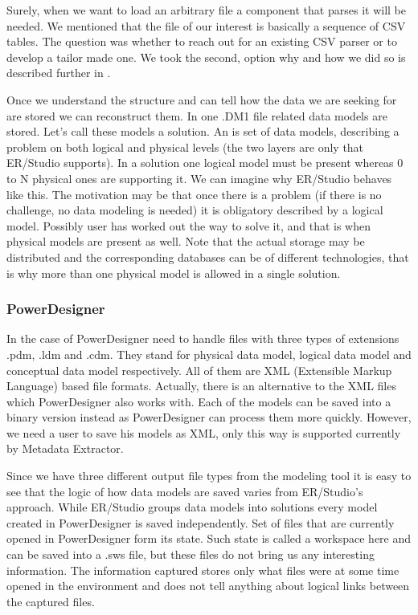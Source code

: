 Surely, when we want to load an arbitrary file a component that parses it will be needed. 
We mentioned that the file of our interest is basically a sequence of CSV tables. The question was whether to reach out for an existing CSV parser or to develop a tailor made one. We took the second, option why and how we did so is described further in .

Once we understand the structure and can tell how the data we are seeking for are stored we can reconstruct them.
In one .DM1 file related data models are stored. Let's call these models a solution. An  is set of data models, describing a problem on both logical and physical levels (the two layers are only that ER/Studio supports). In a solution one logical model must be present whereas 0 to N physical ones are supporting it. 
We can imagine why ER/Studio behaves like this. The motivation may be that once there is a problem (if there is no challenge, no data modeling is needed) it is obligatory described by a logical model. Possibly user has worked out the way to solve it, and that is when physical models are present as well. 
Note that the actual storage may be distributed and the corresponding databases can be of different technologies, that is why more than one physical model is allowed in a single solution.

\subsubsection{PowerDesigner}

In the case of PowerDesigner need to handle files with three types of extensions .pdm, .ldm and .cdm. They  stand for physical data model, logical data model and conceptual data model respectively.
All of them are XML (Extensible Markup Language) based file formats.
Actually, there is an alternative to the XML files which PowerDesigner also works with. Each of the models can be saved into a binary version instead as PowerDesigner can process them more quickly. However, we need a user to save his models as XML, only this way is supported currently by Metadata Extractor.

Since we have three different output file types from the modeling tool it is easy to see that the logic of how data models are saved varies from ER/Studio's approach. 
While ER/Studio groups data models into solutions every model created in PowerDesigner is saved independently. Set of files that are currently opened in PowerDesigner form its state. Such state is called a workspace here and can be saved into a .sws file, but these files do not bring us any interesting information. The information captured stores only what files were at some time opened in the environment and does not tell anything about logical links between the captured files.

